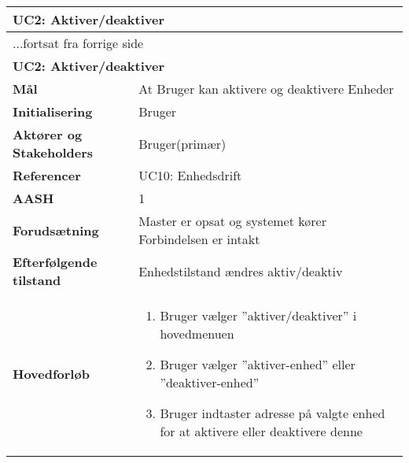 \begin{center} \centering \label{UC2} 
	\begin{longtable}{|p{5cm}|p{9cm}|}  %
	\hline
		\multicolumn{2}{|l|}{\textbf{UC2: Aktiver/deaktiver}} \\\hline %
		\endfirsthead
		
		\multicolumn{2}{l}{...fortsat fra forrige side} \\ \hline %
		\multicolumn{2}{|l|}{\textbf{UC2: Aktiver/deaktiver}} \\\hline %
		\endhead	
		
		\textbf{Mål}								&At Bruger kan aktivere og deaktivere Enheder	\\\hline
		\textbf{Initialisering}					&Bruger				\\\hline
		\textbf{Aktører og Stakeholders}			&Bruger(primær)		\\\hline
		\textbf{Referencer}						&UC10: Enhedsdrift	\\\hline
		\textbf{AASH}							&1					\\\hline
		\textbf{Forudsætning}					&Master er opsat og systemet kører \newline
												 Forbindelsen er intakt	\\\hline
		\textbf{Efterfølgende tilstand}			&Enhedstilstand ændres aktiv/deaktiv\\\hline
		\textbf{Hovedforløb}					
			&\begin{enumerate}
	
				\item Bruger vælger ''aktiver/deaktiver'' i hovedmenuen
				
				\item Bruger vælger ''aktiver-enhed'' eller ''deaktiver-enhed''
				
				\item Bruger indtaster adresse på valgte enhed for at aktivere eller deaktivere denne	
	
			\end{enumerate}\\\hline
	\end{longtable}
\end{center}

